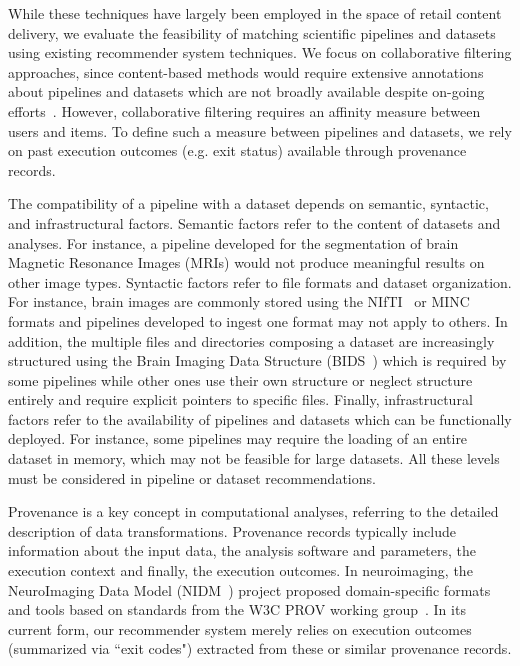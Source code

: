  While these techniques have largely been employed in the space of retail
 content delivery, we evaluate the feasibility of matching scientific pipelines and datasets
 using existing recommender system techniques. We focus on collaborative
 filtering approaches, since content-based methods would require extensive
 annotations about pipelines and datasets which are not broadly available
 despite on-going
 efforts~\cite{NeuroimagingDataModel,sansone2017dats,DATSDocumentation}.
 However, collaborative filtering requires an affinity measure
 between users and items. To define such a measure between pipelines and
 datasets, we rely on past execution outcomes (e.g. exit status) available through provenance records.

The compatibility of a pipeline with a dataset depends on
semantic, syntactic, and infrastructural factors. Semantic factors refer to
the content of datasets and analyses. For instance, a pipeline developed
for the segmentation of brain Magnetic Resonance Images (MRIs) would not produce
meaningful results on other image types. Syntactic factors refer to file
formats and dataset organization. For instance, brain images are commonly
stored using the NIfTI~\cite{larobina2014medical} or
MINC~\cite{vincent2016minc} formats and pipelines developed to ingest one
format may not apply to others. In addition, the multiple files and
directories composing a dataset are increasingly structured using the Brain
Imaging Data Structure (BIDS~\cite{bids}) which is required by some
pipelines while other ones use their own structure or neglect structure entirely and require explicit pointers to specific files. Finally,
infrastructural factors refer to the availability of pipelines
and datasets which can be functionally deployed. For instance, some pipelines may require the loading of an
entire dataset in memory, which may not be feasible for large datasets. All
these levels must be considered in pipeline or dataset recommendations.

Provenance is a key concept in computational analyses, referring to the
detailed description of data transformations. Provenance records typically include
information about the input data, the analysis
software and parameters, the execution context and finally, the execution outcomes. In neuroimaging, the NeuroImaging Data Model (NIDM~\cite{maumet2016sharing}) project proposed domain-specific
formats and tools based on standards from the W3C PROV working
group~\cite{missier2013w3c}. In its current form, our
recommender system merely relies on execution outcomes (summarized via ``exit codes")
extracted from these or similar provenance records.

